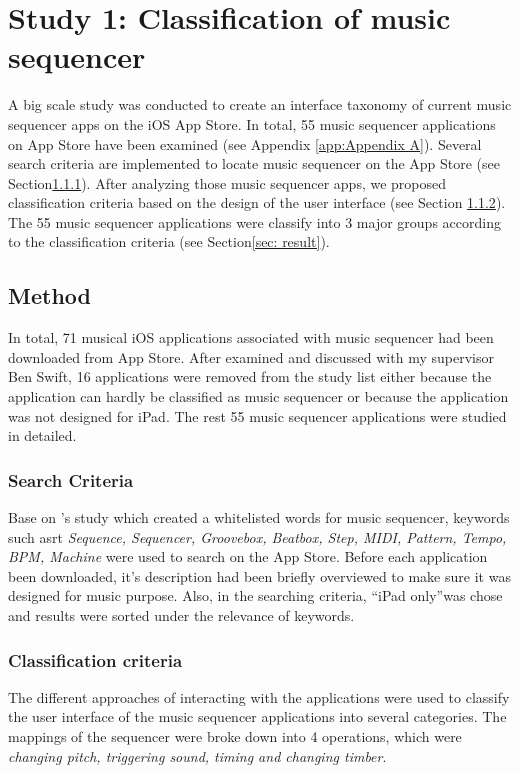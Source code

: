 \pagestyle{fancy}
\rhead{\thepage}
\chapter{Study 1: Classification of music sequencer}
\label{ch: chapter 3}

A big scale study was conducted to create an interface taxonomy of current music sequencer apps on the iOS App Store. In total, 55 music sequencer applications on App Store have been examined (see Appendix \ref{app:Appendix A}). Several search criteria are implemented to locate music sequencer on the App Store (see Section\ref{subsec: search criteria}). After analyzing those music sequencer apps, we proposed classification criteria based on the design of the user interface (see Section \ref{sec: classify criteria}). The 55 music sequencer applications were classify into 3 major groups according to the classification criteria (see Section\ref{sec: result}).

\section{Method}
\label{sec:method}

In total, 71 musical iOS applications associated with music sequencer had been downloaded from App Store. After examined and discussed with my supervisor Ben Swift, 16 applications were removed from the study list either because the application can hardly be classified as music sequencer or because the application was not designed for iPad. The rest 55 music sequencer applications were studied in detailed.

\subsection{Search Criteria}
\label{subsec: search criteria}

Base on \citeauthor{Reference13}'s study which created a whitelisted words for music sequencer, keywords such asrt \textit{Sequence, Sequencer, Groovebox, Beatbox, Step, MIDI, Pattern, Tempo, BPM, Machine} were used to search on the App Store. Before each application been downloaded, it's description had been briefly overviewed to make sure it was designed for music purpose. Also, in the searching criteria, \textquotedblleft{iPad only}\textquotedblright was chose and results were sorted under the relevance of keywords.

\subsection{Classification criteria}
\label{sec: classify criteria}
The different approaches of interacting with the applications were used to classify the user interface of the music sequencer applications into several categories. The mappings of the sequencer were broke down into 4 operations,
which were \textit{changing pitch, triggering sound, timing and changing timber}.

